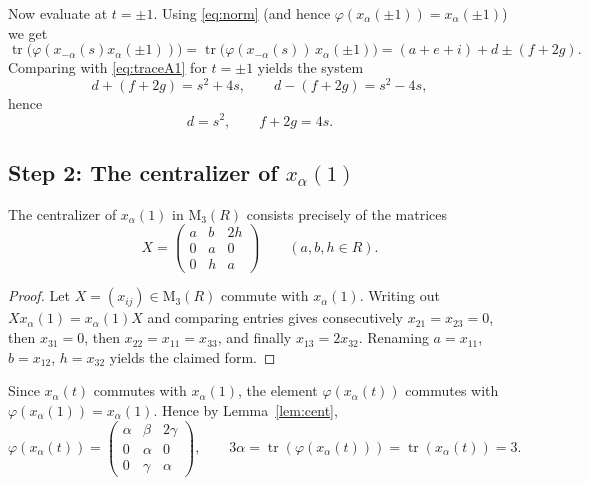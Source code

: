 \documentclass[]{jgcc}
\DeclareMathOperator{\tr}{tr}
\numberwithin{equation}{section}
\begin{document}
Now evaluate at $t=\pm1$. Using \eqref{eq:norm} (and hence $\varphi(x_\alpha(\pm1))=x_\alpha(\pm1)$) we get
\[
\tr\bigl(\varphi(x_{-\alpha}(s)x_\alpha(\pm1))\bigr)
=\tr\bigl(\varphi(x_{-\alpha}(s))\,x_\alpha(\pm1)\bigr)
=(a+e+i)+d\pm(f+2g).
\]
Comparing with \eqref{eq:traceA1} for $t=\pm1$ yields the system
\[
d+(f+2g)=s^2+4s,\qquad d-(f+2g)=s^2-4s,
\]
hence
\begin{equation}\label{eq:d-g}
d=s^2,\qquad f+2g=4s.
\end{equation}

\subsection*{\texorpdfstring{Step 2: The centralizer of $x_\alpha(1)$}{Step 2: The centralizer of xalpha(1)}}
\begin{lem}\label{lem:cent}
The centralizer of $x_\alpha(1)$ in $\mathrm{M}_3(R)$ consists precisely of the matrices
\[
X=\begin{pmatrix}
a& b& 2h\\
0& a& 0\\
0& h& a
\end{pmatrix}\qquad (a,b,h\in R).
\]
\end{lem}

\begin{proof}
Let $X=(x_{ij})\in \mathrm{M}_3(R)$ commute with $x_\alpha(1)$.
Writing out $Xx_\alpha(1)=x_\alpha(1)X$ and comparing entries gives consecutively
$x_{21}=x_{23}=0$, then $x_{31}=0$, then $x_{22}=x_{11}=x_{33}$, and finally $x_{13}=2x_{32}$.
Renaming $a=x_{11}$, $b=x_{12}$, $h=x_{32}$ yields the claimed form.
\end{proof}

Since $x_\alpha(t)$ commutes with $x_\alpha(1)$, the element $\varphi(x_\alpha(t))$ commutes with
$\varphi(x_\alpha(1))=x_\alpha(1)$. Hence by Lemma~\ref{lem:cent},
\begin{equation}\label{eq:phi-xa}
\varphi(x_\alpha(t))=
\begin{pmatrix}
\alpha& \beta& 2\gamma\\
0& \alpha& 0\\
0& \gamma& \alpha
\end{pmatrix},
\qquad 3\alpha=\tr(\varphi(x_\alpha(t)))=\tr(x_\alpha(t))=3.
\end{equation}
\end{document}
